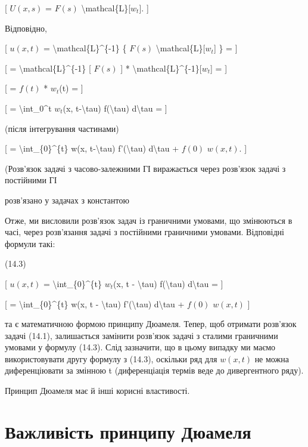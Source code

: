\documentclass[
]{article}
\begin{document}
{{{[} \(U(x, s)\) = \(F(s)\) \textbackslash mathcal\{L\}{[}\(w_t\){]}. {]}

Відповідно,

{[} \(u(x, t)\) = \textbackslash mathcal\{L\}\^{}\{-1\} \{ \(F(s)\)
\textbackslash mathcal\{L\}{[}\(w_t\){]} \} = {]}

{[} = \textbackslash mathcal\{L\}\^{}\{-1\} {[} \(F(s)\) {]} *
\textbackslash mathcal\{L\}\^{}\{-1\}{[}\(w_t\){]} = {]}

{[} = \(f(t)\) * \(w_t\)(t) = {]}

{[} = \textbackslash int\_0\^{}t \(w_t\)(x, t-\textbackslash tau)
f(\textbackslash tau) d\textbackslash tau = {]}

(після інтегрування частинами)

{[} = \textbackslash int\_\{0\}\^{}\{t\} w(x, t-\textbackslash tau)
f'(\textbackslash tau) d\textbackslash tau + \(f(0)\) \(w(x, t)\). {]}

(Розв'язок задачі з часово-залежними ГІ виражається через розв'язок
задачі з постійними ГІ

розв'язано у задачах з константою

Отже, ми висловили розв'язок задач із граничними умовами, що змінюються
в часі, через розв'язання задачі з постійними граничними умовами.
Відповідні формули такі:

(14.3)

{[} \(u(x, t)\) = \textbackslash int\_\{0\}\^{}\{t\} \(w_{t}\)(x, t -
\textbackslash tau) f(\textbackslash tau) d\textbackslash tau = {]}

{[} = \textbackslash int\_\{0\}\^{}\{t\} w(x, t - \textbackslash tau)
f'(\textbackslash tau) d\textbackslash tau + \(f(0)\) \(w(x, t)\) {]}

та є математичною формою принципу Дюамеля. Тепер, щоб отримати розв'язок
задачі (14.1), залишається замінити розв'язок задачі з сталими
граничними умовами у формулу (14.3). Слід зазначити, що в цьому випадку
ми маємо використовувати другу формулу з (14.3), оскільки ряд для
\(w(x, t)\) не можна диференціювати за змінною t (диференціація термів
веде до дивергентного ряду).

Принцип Дюамеля має й інші корисні властивості.

\section{Важливість принципу
Дюамеля}\label{ux432ux430ux436ux43bux438ux432ux456ux441ux442ux44c-ux43fux440ux438ux43dux446ux438ux43fux443-ux434ux44eux430ux43cux435ux43bux44f}

}}
\end{document}

